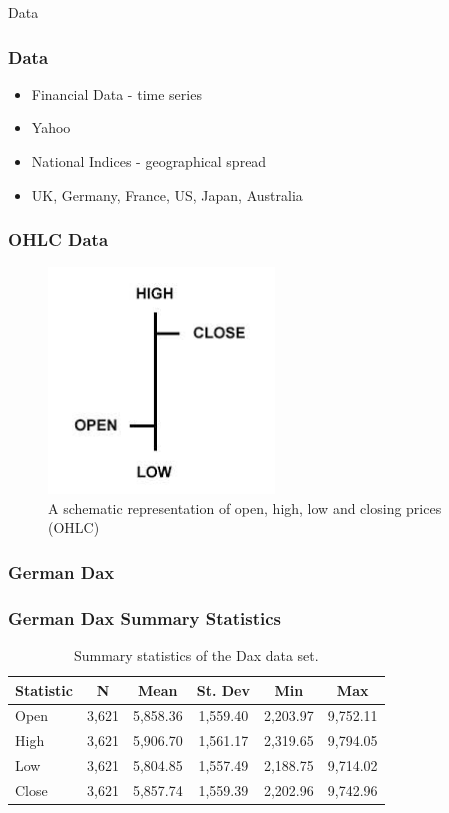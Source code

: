 \documentclass{beamer}
\begin{document}
\begin{frame}
\Huge{\centerline{Data}}
\end{frame}

\begin{frame}
\frametitle{Data}
\begin{itemize}
\item Financial Data - time series
\item Yahoo
\item National Indices - geographical spread
\item UK, Germany, France, US, Japan, Australia
\end{itemize}
\end{frame}

\begin{frame}
\frametitle{OHLC Data}
\begin{figure}
\centering
\includegraphics[width=6cm]{../Figures/chp3_ohlc}
\caption[]{A schematic representation of open, high, low and closing prices (OHLC)}
\label{fig:chp3_ohlc}
\end{figure}
\end{frame}

\begin{frame}
\frametitle{German Dax}

\end{frame}

\begin{frame}
\frametitle{German Dax Summary Statistics}
\begin{table}[!htbp] \centering
\caption[Dax summary statistics.]{Summary statistics of the Dax data set.}
\label{tab:daxsum}
\begin{tabular}{lccccc}
\toprule
Statistic & N & Mean & St. Dev & Min & Max \\
\midrule
Open  & 3,621 & 5,858.36 & 1,559.40 & 2,203.97 & 9,752.11 \\
High  & 3,621 & 5,906.70 & 1,561.17 & 2,319.65 & 9,794.05 \\
Low   & 3,621 & 5,804.85 & 1,557.49 & 2,188.75 & 9,714.02 \\
Close & 3,621 & 5,857.74 & 1,559.39 & 2,202.96 & 9,742.96 \\
\bottomrule
\end{tabular}
\end{table}
\end{frame}
\end{document}
